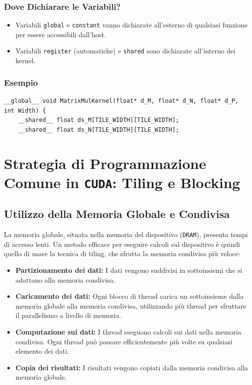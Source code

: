 \subsubsection{Dove Dichiarare le Variabili?}
\begin{itemize}
    \item Variabili \texttt{global} e \texttt{constant} vanno dichiarate
    all'esterno di qualsiasi funzione per essere accessibili dall'host.
    \item Variabili \texttt{register} (automatiche) e \texttt{shared}
    sono dichiarate all'interno dei kernel.
\end{itemize}

\subsubsection{Esempio}
\begin{lstlisting}
__global__ void MatrixMulKernel(float* d_M, float* d_N, float* d_P, int Width) {
    __shared__ float ds_M[TILE_WIDTH][TILE_WIDTH];
    __shared__ float ds_N[TILE_WIDTH][TILE_WIDTH];
\end{lstlisting}


\section{Strategia di Programmazione Comune in \texttt{CUDA}: Tiling e Blocking}

\subsection{Utilizzo della Memoria Globale e Condivisa}
La memoria globale, situata nella memoria del dispositivo (\texttt{DRAM}), presenta
tempi di accesso lenti. Un metodo efficace per eseguire calcoli sul dispositivo
è quindi quello di usare la tecnica di tiling, che sfrutta la memoria condivisa
più veloce:
\begin{itemize}
    \item \textbf{Partizionamento dei dati:} I dati vengono suddivisi in sottoinsiemi
    che si adattano alla memoria condivisa.
    \item \textbf{Caricamento dei dati:} Ogni blocco di thread carica un sottoinsieme 
    dalla memoria globale alla memoria condivisa, utilizzando più thread per sfruttare 
    il parallelismo a livello di memoria.
    \item \textbf{Computazione sui dati:} I thread eseguono calcoli sui dati nella 
    memoria condivisa. Ogni thread può passare efficientemente più volte su qualsiasi 
    elemento dei dati.
    \item \textbf{Copia dei risultati:} I risultati vengono copiati dalla memoria 
    condivisa alla memoria globale.
\end{itemize}

